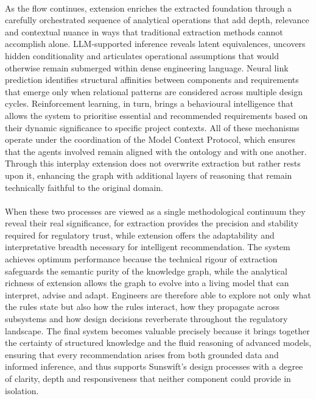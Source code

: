         \paragraph{}
        As the flow continues, extension enriches the extracted foundation through a carefully orchestrated sequence of analytical operations that add depth, relevance and contextual nuance in ways that traditional extraction methods cannot accomplish alone. LLM-supported inference reveals latent equivalences, uncovers hidden conditionality and articulates operational assumptions that would otherwise remain submerged within dense engineering language. Neural link prediction identifies structural affinities between components and requirements that emerge only when relational patterns are considered across multiple design cycles. Reinforcement learning, in turn, brings a behavioural intelligence that allows the system to prioritise essential and recommended requirements based on their dynamic significance to specific project contexts. All of these mechanisms operate under the coordination of the Model Context Protocol, which ensures that the agents involved remain aligned with the ontology and with one another. Through this interplay extension does not overwrite extraction but rather rests upon it, enhancing the graph with additional layers of reasoning that remain technically faithful to the original domain.

        \paragraph{}
        When these two processes are viewed as a single methodological continuum they reveal their real significance, for extraction provides the precision and stability required for regulatory trust, while extension offers the adaptability and interpretative breadth necessary for intelligent recommendation. The system achieves optimum performance because the technical rigour of extraction safeguards the semantic purity of the knowledge graph, while the analytical richness of extension allows the graph to evolve into a living model that can interpret, advise and adapt. Engineers are therefore able to explore not only what the rules state but also how the rules interact, how they propagate across subsystems and how design decisions reverberate throughout the regulatory landscape. The final system becomes valuable precisely because it brings together the certainty of structured knowledge and the fluid reasoning of advanced models, ensuring that every recommendation arises from both grounded data and informed inference, and thus supports Sunswift’s design processes with a degree of clarity, depth and responsiveness that neither component could provide in isolation.

